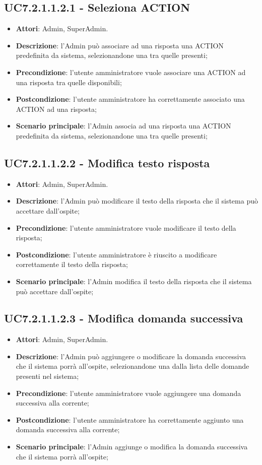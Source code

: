 \documentclass[../AnalisiDeiRequisiti_v3.0.0.tex]{subfiles}
\begin{document}
\begin{itemize}
\subsection{UC7.2.1.1.2.1 - Seleziona ACTION} 
\label{sssec:UC7.2.1.1.2.1} 
\begin{itemize} 
\item \textbf{Attori}: Admin, SuperAdmin.
\item \textbf{Descrizione}: l'Admin può associare ad una risposta una ACTION predefinita da sistema, selezionandone una tra quelle presenti;
\item \textbf{Precondizione}: l'utente amministratore vuole associare una ACTION ad una risposta tra quelle disponibili;
\item \textbf{Postcondizione}: l'utente amministratore ha correttamente associato una ACTION ad una risposta;\item \textbf{Scenario principale}: l'Admin associa ad una risposta una ACTION predefinita da sistema, selezionandone una tra quelle presenti;
\end{itemize}
\subsection{UC7.2.1.1.2.2 - Modifica testo risposta} 
\label{sssec:UC7.2.1.1.2.2} 
\begin{itemize} 
\item \textbf{Attori}: Admin, SuperAdmin.
\item \textbf{Descrizione}: l'Admin può modificare il testo della risposta che il sistema può accettare dall'ospite;
\item \textbf{Precondizione}: l'utente amministratore vuole modificare il testo della risposta;
\item \textbf{Postcondizione}: l'utente amministratore è riuscito a modificare correttamente il testo della risposta;
\item \textbf{Scenario principale}: l'Admin modifica il testo della risposta che il sistema può accettare dall'ospite;
\end{itemize} 
\subsection{UC7.2.1.1.2.3 - Modifica domanda successiva} 
\label{sssec:UC7.2.1.1.2.3} 
\begin{itemize} 
\item \textbf{Attori}: Admin, SuperAdmin.
\item \textbf{Descrizione}: l'Admin può aggiungere o modificare la domanda successiva che il sistema porrà all'ospite, selezionandone una dalla lista delle domande presenti nel sistema;
\item \textbf{Precondizione}: l'utente amministratore vuole aggiungere una domanda successiva alla corrente;
\item \textbf{Postcondizione}: l'utente amministratore ha correttamente aggiunto una domanda successiva alla corrente;
\item \textbf{Scenario principale}: l'Admin aggiunge o modifica la domanda successiva che il sistema porrà all'ospite;
\end{itemize} 

\end{itemize}
\end{document}
